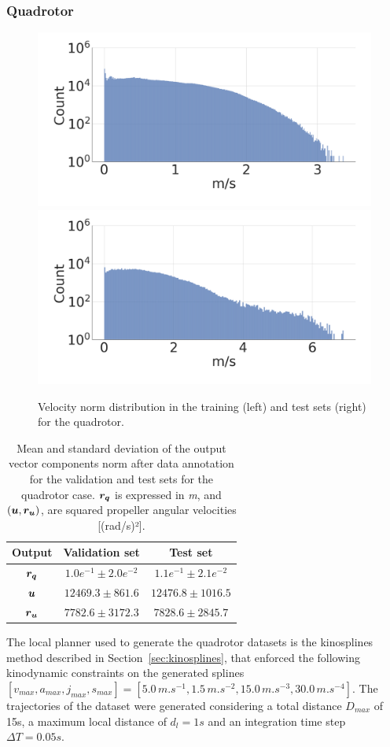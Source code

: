 \subsubsection{Quadrotor}\label{sec:dataset_quad}

\begin{figure} [t]
    \centering
    \includegraphics[width=0.49\linewidth]{figures/learning_quadrotor/vnorm_val2.png}
    \includegraphics[width=0.49\linewidth]{figures/learning_quadrotor/vnorm_test.png}
    \caption{Velocity norm distribution in the training (left) and test sets (right) for the quadrotor.}%
    \label{fig: valvstest}%
\end{figure}

\begin{table}[t]
    \centering
    \begin{tabular}{ | c | c || c |}
    \hline
      \textbf{Output}  & \textbf{Validation set}  & \textbf{Test set} \\ \hline
    $\boldsymbol{r_q}$ & $1.0e^{-1} \pm 2.0e^{-2}$ & $1.1e^{-1} \pm 2.1e^{-2}$ \\ \hline
    $\boldsymbol{u}$ & $12469.3 \pm 861.6$ & $12476.8 \pm 1016.5$ \\ \hline
    $\boldsymbol{r_u}$ & $7782.6 \pm 3172.3$ & $7828.6 \pm 2845.7$ \\ \hline
\end{tabular}
\caption{
Mean and standard deviation of the output vector components norm after data annotation for the validation and test sets for the quadrotor case.
$\boldsymbol{r_q}$ is expressed in \emph{m}, and $(\boldsymbol{u}, \boldsymbol{r_u})$, are squared propeller angular velocities [(rad/s)²].}
 \label{tab:datas_stats}
\end{table}

The local planner used to generate the quadrotor datasets is the kinosplines method described in Section~\ref{sec:kinosplines}, that enforced the following kinodynamic constraints on the generated splines $[v_{max}, a_{max}, j_{max}, s_{max}] = [5.0 \, m.s^{-1}, \allowbreak 1.5 \, m.s^{-2}, \allowbreak 15.0 \, m.s^{-3}, \allowbreak 30.0 \, m.s^{-4}]$. 
The trajectories of the dataset were generated considering a total distance $D_{max}$ of 15s, a maximum local distance of $d_l = 1s$ and an integration time step $\Delta T = 0.05s$. 


